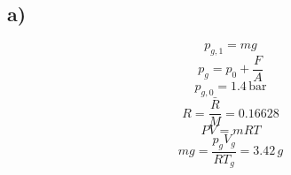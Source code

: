 

\subsection*{a)}
\[
p_{g,1} = mg
\]
\[
p_g = p_0 + \frac{F}{A}
\]
\[
p_{g,0} = 1.4 \, \text{bar}
\]
\[
R = \frac{\bar{R}}{M} = 0.16628
\]
\[
PV = mRT
\]
\[
mg = \frac{p_g V_g}{R T_g} = 3.42 \, g
\]